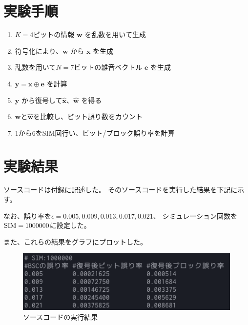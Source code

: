 \documentclass[12pt]{jarticle}
\begin{document}
\section{実験手順}
\begin{enumerate}
    \item $K=4$ビットの情報 $\boldsymbol{w}$ を乱数を用いて生成
    \item 符号化により、$\boldsymbol{w}$ から $\boldsymbol{x}$ を生成
    \item 乱数を用いて$N=7$ビットの雑音ベクトル $\boldsymbol{e}$ を生成
    \item $\boldsymbol{y}=\boldsymbol{x}\oplus \boldsymbol{e}$ を計算
    \item $\boldsymbol{y}$ から復号して$\hat{\boldsymbol{x}}$、$\hat{\boldsymbol{w}}$ を得る
    \item $\boldsymbol{w}$と$\hat{\boldsymbol{w}}$を比較し、ビット誤り数をカウント
    \item 1から6をSIM回行い、ビット/ブロック誤り率を計算
\end{enumerate}

\clearpage

\section{実験結果}

ソースコードは付録に記述した。
そのソースコードを実行した結果を下記に示す。

なお、誤り率を$\epsilon=0.005,0.009,0.013,0.017,0.021$、
シミュレーション回数を$\rm{SIM}=1000000$に設定した。

また、これらの結果をグラフにプロットした。

\begin{figure}[h]
    \begin{center}
        \includegraphics[scale=0.5]{kadai3_3_3.png}
    \end{center}
    \caption{ソースコードの実行結果}
\end{figure}
\end{document}

